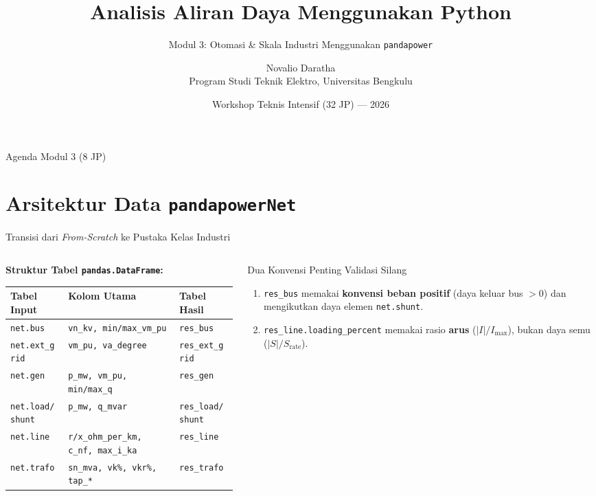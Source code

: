 \documentclass[aspectratio=169,10pt]{beamer}
\title[Aliran Daya Python — Modul 3]{Analisis Aliran Daya Menggunakan Python}
\subtitle{Modul 3: Otomasi \& Skala Industri Menggunakan \texttt{pandapower}}
\author[Novalio Daratha]{Novalio Daratha\\Program Studi Teknik Elektro, Universitas Bengkulu}
\date{Workshop Teknis Intensif (32 JP) — 2026}
\begin{document}
\begin{frame}
  \titlepage
\end{frame}

\begin{frame}{Agenda Modul 3 (8 JP)}
  \tableofcontents
\end{frame}

\section{Arsitektur Data \texttt{pandapowerNet}}

\begin{frame}{Transisi dari \textit{From-Scratch} ke Pustaka Kelas Industri}
  \begin{columns}[T]
    \begin{column}{0.54\textwidth}
      \textbf{Struktur Tabel \texttt{pandas.DataFrame}:}
      \vspace{0.15cm}
      \scriptsize
      \begin{tabular}{@{}lll@{}}
        \toprule
        \textbf{Tabel Input} & \textbf{Kolom Utama} & \textbf{Tabel Hasil} \\
        \midrule
        \texttt{net.bus} & \texttt{vn\_kv, min/max\_vm\_pu} & \texttt{res\_bus} \\
        \texttt{net.ext\_grid} & \texttt{vm\_pu, va\_degree} & \texttt{res\_ext\_grid} \\
        \texttt{net.gen} & \texttt{p\_mw, vm\_pu, min/max\_q} & \texttt{res\_gen} \\
        \texttt{net.load/shunt} & \texttt{p\_mw, q\_mvar} & \texttt{res\_load/shunt} \\
        \texttt{net.line} & \texttt{r/x\_ohm\_per\_km, c\_nf, max\_i\_ka} & \texttt{res\_line} \\
        \texttt{net.trafo} & \texttt{sn\_mva, vk\%, vkr\%, tap\_*} & \texttt{res\_trafo} \\
        \bottomrule
      \end{tabular}
    \end{column}
    \begin{column}{0.44\textwidth}
      \begin{alertblock}{Dua Konvensi Penting Validasi Silang}
        \begin{enumerate}
          \item \texttt{res\_bus} memakai \textbf{konvensi beban positif} (daya keluar bus $> 0$) dan mengikutkan daya elemen \texttt{net.shunt}.
          \item \texttt{res\_line.loading\_percent} memakai rasio \textbf{arus} ($|I|/I_{\max}$), bukan daya semu ($|S|/S_{\text{rate}}$).
        \end{enumerate}
      \end{alertblock}
    \end{column}
  \end{columns}
\end{frame}
\end{document}
